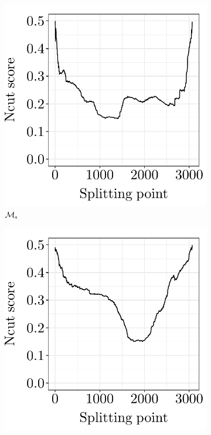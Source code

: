 \begin{figure}[H]
	\begin{subfigure}{.325\textwidth}
		\centering
		\includegraphics[scale=0.4,draft=false]{../../results/us_migration/us_migration_sweep_profile_Ms.pdf}
		\caption{$\mathcal{M}_\mathrm{s}$}
	\end{subfigure}
	\begin{subfigure}{.325\textwidth}
		\centering
		\includegraphics[scale=0.4,draft=false]{../../results/us_migration/us_migration_sweep_profile_M6.pdf}

\end{subfigure}
\end{figure}
